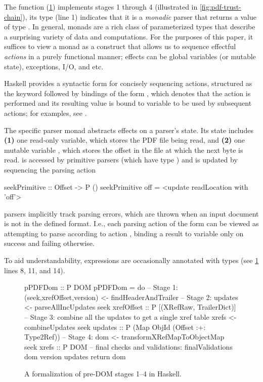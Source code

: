 The function  (\cref{fig:spec}) implements stages 1 through 4 (illustrated in \cref{fig:pdf-trust-chain}),
% 
its type (line 1) indicates that it
is a \emph{monadic} parser  that returns a value of type
.
%
In general, monads are a rich class of parameterized types that
describe a surprising variety of data and computations.
%
For the purposes of this paper, it suffices to view a monad as a
construct that allows us to sequence effectful \emph{actions}
in a purely functional manner;
%
effects can be global variables (or mutable state), exceptions, I/O, and etc.

Haskell provides a syntactic form for concisely sequencing actions, structured as 
the keyword  followed by bindings of the form , which denotes 
that the action  is performed and its resulting value is bound to variable  to be used by subsequent actions;
%
for examples, see .

The specific parser monad  abstracts effects on a parser's state.
%
Its state includes %
\textbf{(1)} one read-only variable, which stores the PDF file being read, and %
\textbf{(2)} one mutable variable \rdloc{}, which stores the offset in the file at which the next byte is read.
%
\rdloc{} is accessed by primitive parsers (which have type )
and is updated by sequencing the parsing action
\begin{codeNoExecute}
  seekPrimitive :: Offset -> P ()
  seekPrimitive off = <update readLocation with 'off'>
\end{codeNoExecute}
%
 parsers implicitly track parsing errors, which are thrown when an input document is not in the defined format.
%
I.e., each parsing action of the form  can be viewed as attempting to parse according to action , binding a result to variable  only on success and failing otherwise.

To aid understandability, expressions are occasionally annotated with types (see \cref{fig:spec} lines 8, 11, and 14).

\begin{figure}[t]
\centering
\lstset{numbers=right}
\begin{code}
pPDFDom :: P DOM
pPDFDom =
    do
    -- Stage 1:
    (seek,xrefOffset,version) <- findHeaderAndTrailer
    -- Stage 2:
    updates <- parseAllIncUpdates seek xrefOffset
               :: P [(XRefRaw, TrailerDict)]
    -- Stage 3: combine all the updates to get a single xref table
    xrefs <- combineUpdates seek updates
             :: P (Map ObjId (Offset :+: Type2Ref))
    -- Stage 4:
    dom <- transformXRefMapToObjectMap seek xrefs
           :: P DOM
    -- final checks and validations:
    finalValidations dom version updates
    return dom
\end{code}
\caption{A formalization of pre-DOM stages 1--4 in Haskell.}
\label{fig:spec}
\end{figure}


